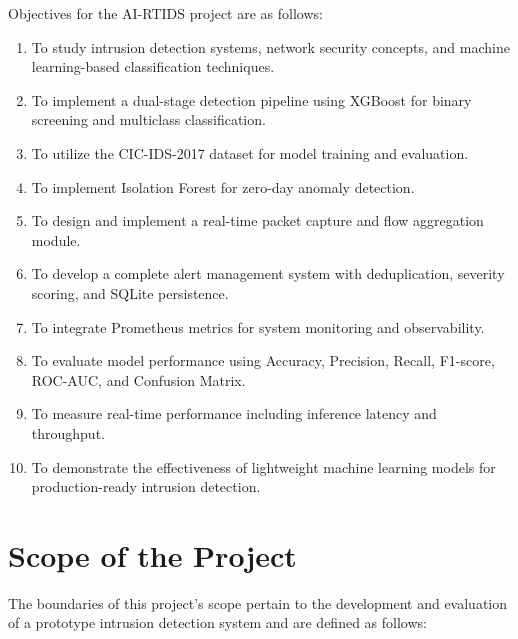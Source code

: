 \documentclass[12pt,a4paper]{report}
\begin{document}
Objectives for the AI-RTIDS project are as follows:

\begin{enumerate}
    \item To study intrusion detection systems, network security concepts, and machine learning-based classification techniques.

    \item To implement a dual-stage detection pipeline using XGBoost for binary screening and multiclass classification.

    \item To utilize the CIC-IDS-2017 dataset for model training and evaluation.

    \item To implement Isolation Forest for zero-day anomaly detection.

    \item To design and implement a real-time packet capture and flow aggregation module.

    \item To develop a complete alert management system with deduplication, severity scoring, and SQLite persistence.

    \item To integrate Prometheus metrics for system monitoring and observability.

    \item To evaluate model performance using Accuracy, Precision, Recall, F1-score, ROC-AUC, and Confusion Matrix.

    \item To measure real-time performance including inference latency and throughput.

    \item To demonstrate the effectiveness of lightweight machine learning models for production-ready intrusion detection.
\end{enumerate}

\section{Scope of the Project}

The boundaries of this project's scope pertain to the development and evaluation of a prototype intrusion detection system and are defined as follows:
\end{document}
